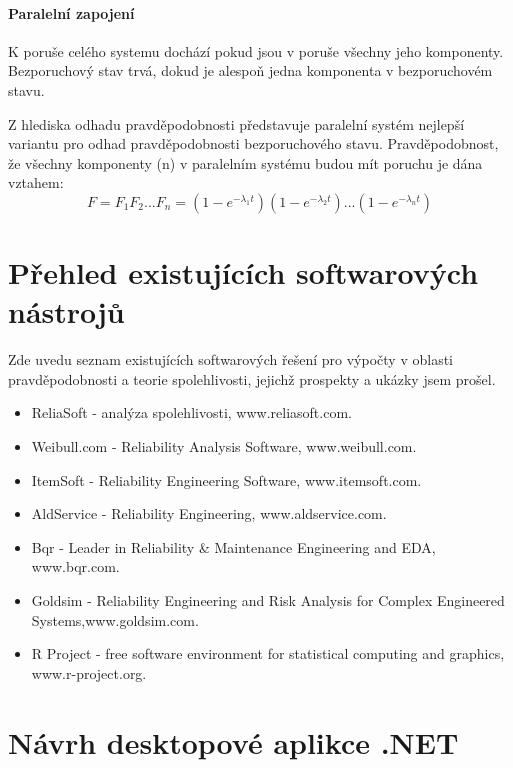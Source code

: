 \documentclass[FM,RP]{tulthesis}
\begin{document}
        \subsubsection*{Paralelní zapojení}
            K poruše celého systemu dochází pokud jsou v poruše všechny jeho komponenty. Bezporuchový stav trvá, dokud je alespoň jedna komponenta v bezporuchovém stavu.
            
            Z hlediska odhadu pravděpodobnosti představuje paralelní systém nejlepší variantu pro odhad pravděpodobnosti bezporuchového stavu. \cite{5}
            Pravděpodobnost, že všechny komponenty (n) v paralelním systému budou mít poruchu je dána vztahem:
            $$ F = F_{1}F_{2}...F_{n} = (1-e^{-\lambda_{1}t})(1-e^{-\lambda_{2}t})...(1-e^{-\lambda_{n}t}) $$



\chapter{Přehled existujících softwarových nástrojů}
    Zde uvedu seznam existujících softwarových řešení pro výpočty v oblasti pravděpodobnosti a teorie spolehlivosti, jejichž prospekty a ukázky jsem prošel.
    \begin{itemize} 
        \item ReliaSoft - analýza spolehlivosti, www.reliasoft.com. \cite{8}
        \item Weibull.com - Reliability Analysis Software, www.weibull.com. \cite{9}
        \item ItemSoft - Reliability Engineering Software, www.itemsoft.com. \cite{10}
        \item AldService - Reliability Engineering, www.aldservice.com. \cite{11}
        \item Bqr - Leader in Reliability \& Maintenance Engineering and EDA, www.bqr.com. \cite{12}
        \item Goldsim - Reliability Engineering and Risk Analysis for Complex Engineered Systems,www.goldsim.com. \cite{13}
        \item R Project - free software environment for statistical computing and graphics, www.r-project.org. \cite{14}
    \end{itemize}

\chapter{Návrh desktopové aplikce .NET}
\end{document}
